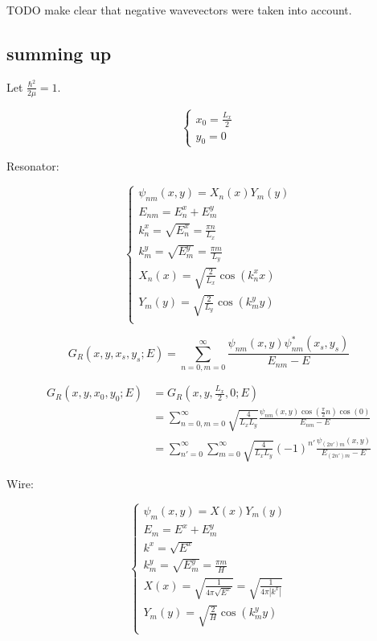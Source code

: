 \documentclass[12pt, a4paper]{article}
\begin{document}
TODO make clear that negative wavevectors were taken into account.

\subsection{summing up}
Let $\frac{\hbar^2}{2 \mu} = 1$.

$$\begin{cases}
x_0 = \frac{L_x}{2} \\
y_0 = 0
\end{cases}$$

Resonator:

$$\begin{cases}
\psi_{nm}(x, y) = X_n(x) Y_m(y) \\
E_{nm} = E^x_n + E^y_m \\
k^x_n = \sqrt{E^x_n} = \frac{\pi n}{L_x} \\
k^y_m = \sqrt{E^y_m} = \frac{\pi m}{L_y} \\
X_n(x) = \sqrt{\frac{2}{L_x}} \cos(k^x_n x) \\
Y_m(y) = \sqrt{\frac{2}{L_y}} \cos(k^y_m y) \\
\end{cases}$$

$$G_R(x, y, x_s, y_s; E) = \sum\limits_{n = 0, m = 0}^\infty \frac{\psi_{nm}(x, y) \psi_{nm}^*(x_s, y_s)}{E_{nm} - E}$$

\begin{align*}
G_R(x, y, x_0, y_0; E)
&= G_R(x, y, \frac{L_x}{2}, 0; E) \\
&= \sum\limits_{n = 0, m = 0}^\infty \sqrt{\frac{4}{L_x L_y}} \frac{\psi_{nm}(x, y) \cos(\frac{\pi}{2} n) \cos(0)}{E_{nm} - E} \\
&= \sum\limits_{n' = 0}^\infty \sum\limits_{m = 0}^\infty \sqrt{\frac{4}{L_x L_y}} (-1)^{n'} \frac{\psi_{(2n')m}(x, y)}{E_{(2n')m} - E}
\end{align*}

Wire:

$$\begin{cases}
\psi_{m}(x, y) = X(x) Y_m(y) \\
E_{m} = E^x + E^y_m \\
k^x = \sqrt{E^x} \\
k^y_m = \sqrt{E^y_m} = \frac{\pi m}{H} \\
X(x) = \sqrt{\frac{1}{4 \pi \sqrt{E^x}}} = \sqrt{\frac{1}{4 \pi |k^x|}} \\
Y_m(y) = \sqrt{\frac{2}{H}} \cos(k^y_m y) \\
\end{cases}$$
\end{document}
